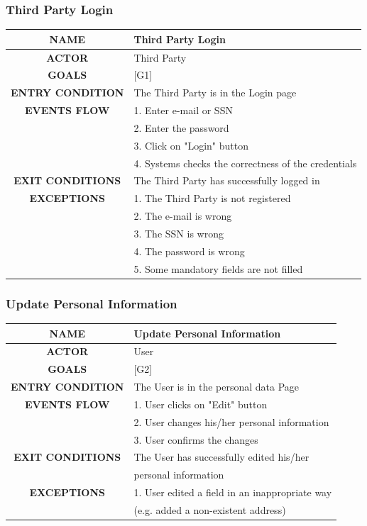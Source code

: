 \documentclass[12pt,a4paper]{article}
\begin{document}
		\subsubsection{Third Party Login}
		\begin{center}
			\begin{tabular}{| c | l |}
				\hline
				\textbf{NAME} & Third Party Login \\
				\hline
				\textbf{ACTOR} & Third Party \\
				\hline
				\textbf{GOALS} & [G1] \\
				\hline
				\textbf{ENTRY CONDITION} & The Third Party is in the Login page \\ \hline
				\textbf{EVENTS FLOW}  &
				1. Enter e-mail or SSN\\
				&2. Enter the password\\
				&3. Click on "Login" button\\
				&4. Systems checks the correctness of the credentials\\
				\hline
				\textbf{EXIT CONDITIONS}  & The Third Party has successfully logged in \\ \hline
				\textbf{EXCEPTIONS} & 
				1. The Third Party is not registered\\
				&2. The e-mail is wrong\\
				&3. The SSN is wrong\\
				&4. The password is wrong\\
				&5. Some mandatory fields are not filled\\
				\hline
			\end{tabular}
		\end{center}
	
		\subsubsection{Update Personal Information}
		\begin{center}
			\begin{tabular}{| c | l |}
				\hline
				\textbf{NAME} & Update Personal Information \\
				\hline
				\textbf{ACTOR} & User \\
				\hline
				\textbf{GOALS} & [G2] \\
				\hline
				\textbf{ENTRY CONDITION} & The User is in the personal data Page \\ \hline
				\textbf{EVENTS FLOW}  &
				1. User clicks on "Edit" button\\
				&2. User changes his/her personal information\\
				&3. User confirms the changes\\
				\hline
				\textbf{EXIT CONDITIONS}  
				& The User has successfully edited his/her \\
				& personal information \\ \hline
				\textbf{EXCEPTIONS} & 
				1. User edited a field in an inappropriate way \\
				& (e.g. added a non-existent address)\\
				\hline
			\end{tabular}
		\end{center}
		
\end{document}
